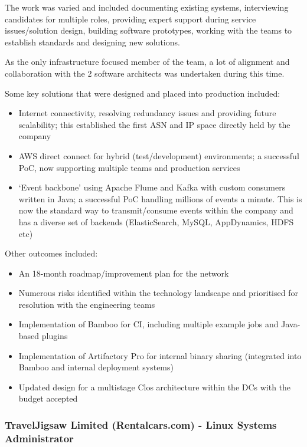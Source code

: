 The work was varied and included documenting existing systems,
interviewing candidates for multiple roles, providing expert support
during service issues/solution design, building software prototypes,
working with the teams to establish standards and designing new
solutions.

As the only infrastructure focused member of the team, a lot of
alignment and collaboration with the 2 software architects was
undertaken during this time.

Some key solutions that were designed and placed into production
included:

\begin{itemize}
\tightlist
\item
  Internet connectivity, resolving redundancy issues and providing
  future scalability; this established the first ASN and IP space
  directly held by the company
\item
  AWS direct connect for hybrid (test/development) environments; a
  successful PoC, now supporting multiple teams and production services
\item
  `Event backbone' using Apache Flume and Kafka with custom consumers
  written in Java; a successful PoC handling millions of events a
  minute. This is now the standard way to transmit/consume events within
  the company and has a diverse set of backends (ElasticSearch, MySQL,
  AppDynamics, HDFS etc)
\end{itemize}

Other outcomes included:

\begin{itemize}
\tightlist
\item
  An 18-month roadmap/improvement plan for the network
\item
  Numerous risks identified within the technology landscape and
  prioritised for resolution with the engineering teams
\item
  Implementation of Bamboo for CI, including multiple example jobs and
  Java-based plugins
\item
  Implementation of Artifactory Pro for internal binary sharing
  (integrated into Bamboo and internal deployment systems)
\item
  Updated design for a multistage Clos architecture within the DCs with
  the budget accepted
\end{itemize}

\subsubsection{TravelJigsaw Limited (Rentalcars.com) - Linux Systems
Administrator}\label{traveljigsaw-limited-rentalcars.com---linux-systems-administrator}

